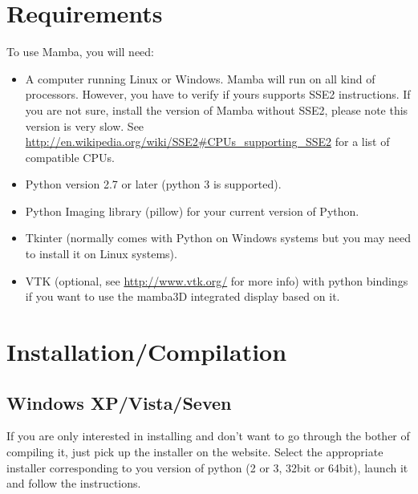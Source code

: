 \documentclass[a4paper,10pt,oneside]{article}
\begin{document}

\pagebreak

\section{Requirements}
\label{cha:Requirements}

To use Mamba, you will need:
\begin{itemize}
\item A computer running Linux or Windows. Mamba will run on all kind of 
processors. However, you have to verify if yours supports SSE2 instructions. If you
are not sure, install the version of Mamba without SSE2, please note this version
is very slow. See \url{http://en.wikipedia.org/wiki/SSE2#CPUs_supporting_SSE2}
for a list of compatible CPUs.
\item Python version 2.7 or later (python 3 is supported).
\item Python Imaging library (pillow) for your current version of Python.
\item Tkinter (normally comes with Python on Windows systems but you may need to
install it on Linux systems).
\item VTK (optional, see \url{http://www.vtk.org/} for more info) with python
bindings if you want to use the mamba3D integrated display based on it.
\end{itemize}


\pagebreak

\section{Installation/Compilation}
\label{cha:inst_comp}

\subsection{Windows XP/Vista/Seven}

If you are only interested in installing and don't want to go through the bother
of compiling it, just pick up the installer on the website. Select the appropriate
installer corresponding to you version of python (2 or 3, 32bit or 64bit), 
launch it and follow the instructions.
\end{document}
